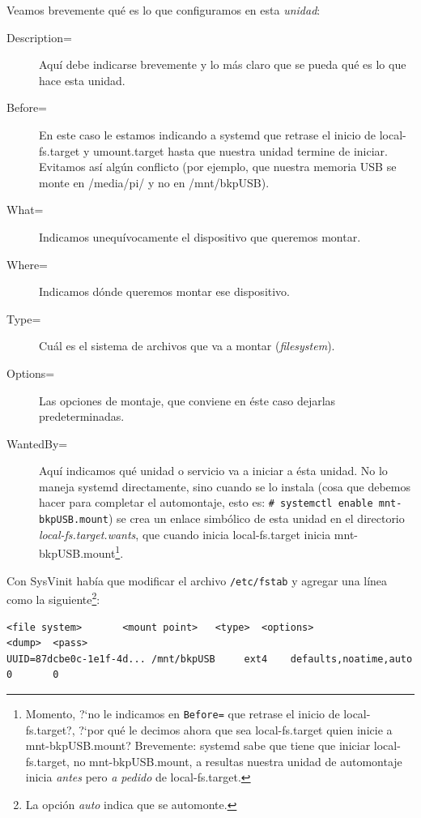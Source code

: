 \documentclass[10pt,a4paper]{article}
\begin{document}
Veamos brevemente qu\'e es lo que configuramos en esta \emph{unidad}:

\begin{description}
    \item [Description=] Aqu\'i debe indicarse brevemente y lo m\'as claro que se pueda qu\'e es lo que hace esta unidad.
    \item [Before=] En este caso le estamos indicando a systemd que retrase el inicio de local-fs.target y umount.target hasta que nuestra unidad termine de iniciar. Evitamos as\'i alg\'un conflicto (por ejemplo, que nuestra memoria USB se monte en /media/pi/ y no en /mnt/bkpUSB).\\
    \item [What=] Indicamos unequ\'ivocamente el dispositivo que queremos montar.
    \item [Where=] Indicamos d\'onde queremos montar ese dispositivo.
    \item [Type=] Cu\'al es el sistema de archivos que va a montar (\emph{filesystem}).
    \item [Options=] Las opciones de montaje, que conviene en \'este caso dejarlas predeterminadas.
    \item [WantedBy=] Aqu\'i indicamos qu\'e unidad o servicio va a iniciar a \'esta unidad. No lo maneja systemd directamente, sino cuando se lo instala (cosa que debemos hacer para completar el automontaje, esto es: \lstinline{# systemctl enable mnt-bkpUSB.mount}) se crea un enlace simb\'olico de esta unidad en el directorio \emph{local-fs.target.wants}, que cuando inicia local-fs.target inicia mnt-bkpUSB.mount\footnote{Momento, ?`no le indicamos en \texttt{Before=} que retrase el inicio de local-fs.target?, ?`por qu\'e le decimos ahora que sea local-fs.target quien inicie a mnt-bkpUSB.mount? Brevemente: systemd sabe que tiene que iniciar local-fs.target, no mnt-bkpUSB.mount, a resultas nuestra unidad de automontaje inicia \emph{antes} pero \emph{a pedido} de local-fs.target.}.
\end{description}

Con SysVinit hab\'ia que modificar el archivo \texttt{/etc/fstab} y agregar una l\'inea como la siguiente\footnote{La opci\'on \emph{auto} indica que se automonte.}:
\begin{scriptsize}
\begin{mdframed}
\begin{verbatim}
<file system>       <mount point>   <type>  <options>               <dump>  <pass>
UUID=87dcbe0c-1e1f-4d... /mnt/bkpUSB     ext4    defaults,noatime,auto   0       0
\end{verbatim}
\end{mdframed}
\end{scriptsize}
\end{document}
